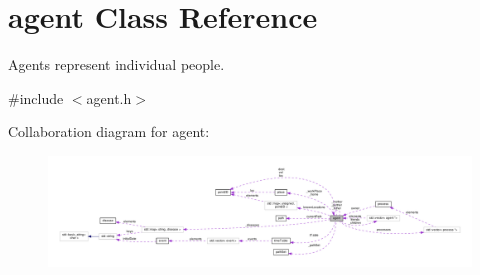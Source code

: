 \hypertarget{classagent}{}\section{agent Class Reference}
\label{classagent}


Agents represent individual people.  




{\ttfamily \#include $<$agent.\+h$>$}



Collaboration diagram for agent\+:\nopagebreak
\begin{figure}[H]
\begin{center}
\leavevmode
\includegraphics[width=350pt]{classagent__coll__graph}
\end{center}
\end{figure}
